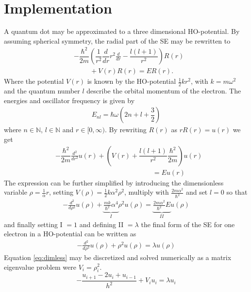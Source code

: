 \documentclass[twoside,twocolumn]{article}
\begin{document}
	\section{Implementation}
	A quantum dot may be approximated to a three dimensional HO-potential. By assuming spherical symmetry, the radial part of the SE may be rewritten to
	\begin{align*}
	&-\dfrac{\hbar^2}{2 m} \left ( \dfrac{1}{r^2} \dfrac{d}{dr} r^2 \frac{d}{dr} - \dfrac{l (l + 1)}{r^2} \right )R(r)\\ 
	&\hspace{1cm}+ V(r) R(r)= E R(r).
	\end{align*}
	Where the potential $V(r)$ is known by the HO-potential $\frac{1}{2}kr^2$, with $k=m\omega^2$ and the quantum number $l$ describe the orbital momentum of the electron.
	The energies and oscillator frequency is given by
	\begin{align*}
	E_{nl} = \hbar\omega\left(2n+l+ \dfrac{3}{2} \right)
	\end{align*}
	where $n\in \mathbb N$, $l\in \mathbb N$ and $r \in [0,\infty)$. By rewriting $R(r)$ as $rR(r) = u(r)$ we get
	\begin{align*}
	&-\dfrac{\hbar^2}{2 m} \frac{d^2}{dr^2} u(r) + \left ( V(r) + \dfrac{l (l + 1)}{r^2}\dfrac{\hbar^2}{2 m} \right ) u(r)\\  
	&\hspace{6cm}=  E u(r)
	\end{align*}
	The expression can be further simplified by introducing the dimensionless variable $\rho = \frac{1}{\alpha}r$, setting $V(\rho) = \frac{1}{2}k\alpha^2\rho^2$, multiply with $\frac{2m\alpha^2}{\hbar^2}$ and set $l=0$ so that
	\begin{align*}
	-\frac{d^2}{d\rho^2} u(\rho) +\underbrace{ \frac{mk}{\hbar^2} \alpha^4}_{I}\rho^2u(\rho)  = \underbrace{\frac{2m\alpha^2}{\hbar^2}E}_{II}u(\rho)
	\end{align*}
	and finally setting I $=1$ and defining II $=\lambda$ the final form of the SE for one electron in a HO-potential can be written as
	\begin{align}
	-\frac{d^2}{d\rho^2} u(\rho) + \rho^2u(\rho)  = \lambda u(\rho)\label{eq:dimless}
	\end{align}
	Equation \ref{eq:dimless} may be discretized and solved numerically as a matrix eigenvalue problem were $V_i=\rho_i^2$. 
	\begin{equation}
	-\frac{u_{i+1}-2u_i+u_{i-1}}{h^2}+V_iu_i = \lambda u_i \label{eq:disk1}
	\end{equation}
\end{document}

